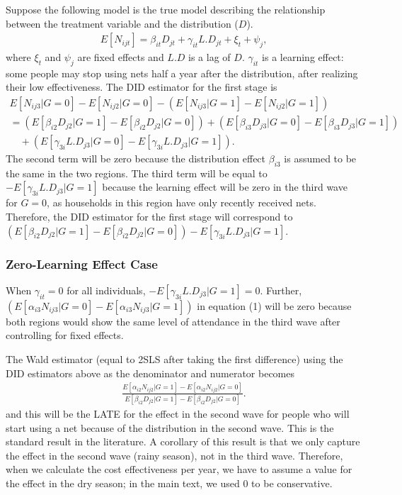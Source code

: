 \documentclass[fleqn,11pt]{article}
\begin{document}
Suppose the following model is the true model describing the relationship between the treatment variable and the distribution ($D$).
\begin{gather*}
E[N_{ijt}] = \beta_{it} D_{jt} + \gamma_{it} L.D_{jt} +  \xi_{t} + \psi_{j}, 
\end{gather*}
where $\xi_{t} $ and $\psi_{j}$ are fixed effects and $L.D$ is a lag of $D$.  $\gamma_{it}$ is a learning effect: some people may stop using nets half a year after the distribution, after realizing their low effectiveness. The DID estimator for the first stage is
\begin{gather*}
E[N_{ij3}|G=0] - E[N_{ij2}|G=0]  - \left(E[N_{ij3}|G=1] - E[N_{ij2}|G=1] \right) \\
=\left( E[\beta_{i2} D_{j2}|G=1]   - E[\beta_{i2}D_{j2}|G=0]\right) +  \left(  E[\beta_{i3}D_{j3}|G=0] - E[\beta_{i3} D_{j3}|G=1]  \right) \\
\quad +  \left(  E[\gamma_{3i}L.D_{j3}|G=0] - E[\gamma_{3i} L.D_{j3}|G=1]  \right) .
\end{gather*}
The second term will be zero because the distribution effect $\beta_{i3}$ is assumed to be the same in the two regions. The third term will be equal to $- E[\gamma_{3i} L.D_{j3}|G=1]$ because the learning effect will be zero in the third wave for $G=0$, as households in this region have only recently received nets. Therefore, the DID estimator for the first stage will correspond to $\left( E[\beta_{i2} D_{j2}|G=1]   - E[\beta_{i2}D_{j2}|G=0]\right)  - E[\gamma_{3i} L.D_{j3}|G=1] $.

\subsubsection{Zero-Learning Effect Case}
When $\gamma_{it} = 0$ for all individuals, $ - E[\gamma_{3i} L.D_{j3}|G=1] = 0$. Further,  
 $ \left(  E[\alpha_{i3}N_{ij3}|G=0] - E[\alpha_{i3} N_{ij3}|G=1] \right) $ in equation (1) will be zero because both regions would show the same level of attendance in the third wave after controlling for fixed effects. 


The Wald estimator (equal to 2SLS after taking the first difference) using the DID estimators above as the denominator and numerator becomes 
\begin{gather*}
\frac{ E[\alpha_{i2} N_{ij2}|G=1]   - E[\alpha_{i2}N_{ij2}|G=0]}{ E[\beta_{i2} D_{j2}|G=1]   -E[\beta_{i2}D_{j2}|G=0]} .
\end{gather*}
and this will be the LATE for the effect in the second wave for people who will start using a net because of the distribution in the second wave. This is the standard result in the literature. A corollary of this result is that we only capture the effect in the second wave (rainy season), not in the third wave. Therefore, when we calculate the cost effectiveness per year, we have to assume a value for the effect in the dry season; in the main text, we used 0 to be conservative.
\end{document}

